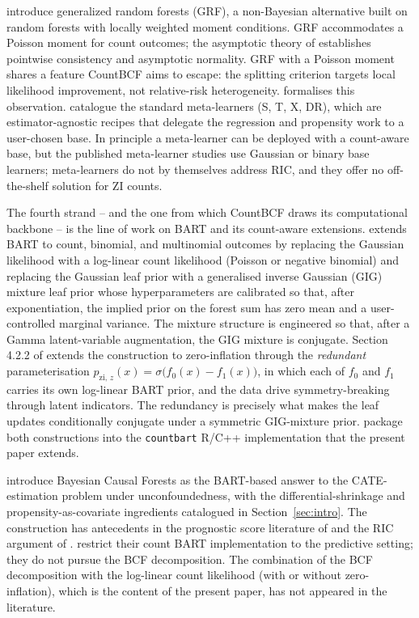 \documentclass[11pt]{article}
\theoremstyle{plain}
\theoremstyle{definition}
\theoremstyle{remark}
\newcommand{\pzi}[1][z]{p_{\mathrm{zi},\,#1}}
\newcommand{\fzeroSym}{f_{0}}
\newcommand{\foneSym}{f_{1}}
\begin{document}
\citet{athey2019generalized} introduce generalized random forests
(GRF), a non-Bayesian alternative built on random forests with locally
weighted moment conditions. GRF accommodates a Poisson moment for
count outcomes; the asymptotic theory of \citet{wager2018estimation}
establishes pointwise consistency and asymptotic normality. GRF with
a Poisson moment shares a feature CountBCF aims to escape: the
splitting criterion targets local likelihood improvement, not
relative-risk heterogeneity. \citet{kennedy2024relative} formalises
this observation. \citet{kunzel2019metalearners} catalogue the
standard meta-learners (S, T, X, DR), which are estimator-agnostic
recipes that delegate the regression and propensity work to a
user-chosen base. In principle a meta-learner can be deployed with a
count-aware base, but the published meta-learner studies use Gaussian
or binary base learners; meta-learners do not by themselves address
RIC, and they offer no off-the-shelf solution for ZI counts.

The fourth strand -- and the one from which CountBCF draws its
computational backbone -- is the line of work on BART and its
count-aware extensions. \citet{murray2021loglinear} extends BART to
count, binomial, and multinomial outcomes by replacing the Gaussian
likelihood with a log-linear count likelihood (Poisson or negative
binomial) and replacing the Gaussian leaf prior with a generalised
inverse Gaussian (GIG) mixture leaf prior whose hyperparameters are
calibrated so that, after exponentiation, the implied prior on the
forest sum has zero mean and a user-controlled marginal variance.
The mixture structure is engineered so that, after a Gamma
latent-variable augmentation, the GIG mixture is conjugate. Section
4.2.2 of \citet{murray2021loglinear} extends the construction to
zero-inflation through the \emph{redundant} parameterisation
$\pzi(x) = \sigma\bigl(\fzeroSym(x) - \foneSym(x)\bigr)$, in which each
of $\fzeroSym$ and $\foneSym$ carries its own log-linear BART prior,
and the data drive symmetry-breaking through latent indicators. The
redundancy is precisely what makes the leaf updates conditionally
conjugate under a symmetric GIG-mixture prior. \citet{wikle2023causal}
package both constructions into the \texttt{countbart} R/C++
implementation that the present paper extends.

\citet{hahn2020bayesian} introduce Bayesian Causal Forests as the
BART-based answer to the CATE-estimation problem under
unconfoundedness, with the differential-shrinkage and
propensity-as-covariate ingredients catalogued in
Section~\ref{sec:intro}. The construction has antecedents in the
prognostic score literature of \citet{hansen2008prognostic} and the
RIC argument of \citet{hahn2016regularization}.
\citet{wikle2023causal} restrict their count BART implementation to
the predictive setting; they do not pursue the BCF decomposition.
The combination of the BCF decomposition with the log-linear count
likelihood (with or without zero-inflation), which is the content of
the present paper, has not appeared in the literature.
\end{document}
